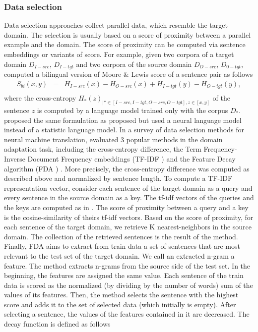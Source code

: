 \subsubsection{Data selection}
Data selection approaches collect parallel data, which resemble the target domain. The selection is usually based on a score of proximity between a parallel example and the domain. The score of proximity can be computed via sentence embeddings or variants of \citet{Moore10intelligent} score. For example, given two corpora of a target domain $D_{I-src}$, $D_{I-tgt}$ and two corpora of the source domain $D_{O-src}$, $D_{0-tgt}$, \citet{Axelrod11domain} computed a bilingual version of Moore $\&$ Lewis score of a sentence pair as follows
\begin{equation}
\begin{array}{rcl}
S_{bi} (x,y) &=& H_{I-src}(x) - H_{O-src}(x) + H_{I-tgt}(y) - H_{O-tgt}(y), \\
\end{array}
\label{eq:ced}
\end{equation}
where the cross-entropy $H_{*}(z)_{| * \in [I-src, I-tgt, O-src, O-tgt], z \in [x,y]}$ of the sentence $z$ is computed by a language model trained only with the corpus $D_{*}$. \citet{Duh13adaptation} proposed the same formulation as proposed \citet{Axelrod11domain} but used a neural language model instead of a statistic language model. In a survey of data selection methods for neural machine translation, \citet{Silva18extracting} evaluated 3 popular methods in the domain adaptation task, including the cross-entropy difference, the Term Frequency-Inverse Document Frequency embeddings (TF-IDF ) \citep{Salton73On} and the Feature Decay algorithm (FDA ) \citep{Poncelas18Feature}. More precisely, the cross-entropy difference was computed as described above and normalized by sentence length. To compute a TF-IDF representation vector, \citet{Silva18extracting} consider each sentence of the target domain as a query and every sentence in the source domain as a key. The tf-idf vectors of the queries and the keys are computed as in \citet{Salton73On}. The score of proximity between a query and a key is the cosine-similarity of theirs tf-idf vectors. Based on the score of proximity, for each sentence of the target domain, we retrieve K nearest-neighbors in the source domain. The collection of the retrieved sentences is the result of the method. Finally, FDA aims to extract from train data a set of sentences that are most relevant to the test set of the target domain. We call an extracted n-gram a feature. The method extracts n-grams from the source side of the test set. In the beginning, the features are assigned the same value. Each sentence of the train data is scored as the normalized (by dividing by the number of words) sum of the values of its features. Then, the method selects the sentence with the highest score and adds it to the set of selected data (which initially is empty). After selecting a sentence, the values of the features contained in it are decreased. The decay function is defined as follows
